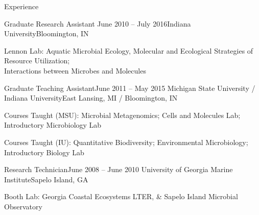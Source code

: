 \documentclass{resume} %
\begin{document}
\begin{rSection}{Experience}
  \begin{rSubsection}{Graduate Research Assistant}
    {June 2010 -- July 2016}{Indiana University}{Bloomington, IN}
    \item Lennon Lab: Aquatic Microbial Ecology, Molecular and Ecological Strategies of Resource Utilization; \\
                      Interactions between Microbes and Molecules
  \end{rSubsection}


  \begin{rSubsection}{Graduate Teaching Assistant}{June 2011 -- May 2015}
    {Michigan State University / Indiana University}{East Lansing, MI / Bloomington, IN}
    \item Courses Taught (MSU): Microbial Metagenomics; Cells and Molecules Lab;
                          Introductory Microbiology Lab
    \item Courses Taught (IU): Quantitative Biodiversity; Environmental Microbiology;
                          Introductory Biology Lab
  \end{rSubsection}

  \begin{rSubsection}{Research Technician}{June 2008 -- June 2010}
    {University of Georgia Marine Institute}{Sapelo Island, GA}
    \item Booth Lab: Georgia Coastal Ecosystems LTER, \& Sapelo Island Microbial
                     Observatory
  \end{rSubsection}



\end{rSection}
\end{document}
